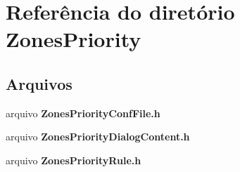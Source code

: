 \section{Referência do diretório Zones\+Priority}
\label{dir_1fe8d817410ee6ec2505eedad072a203}
\subsection*{Arquivos}
\begin{DoxyCompactItemize}
\item 
arquivo {\bf Zones\+Priority\+Conf\+File.\+h}
\item 
arquivo {\bf Zones\+Priority\+Dialog\+Content.\+h}
\item 
arquivo {\bf Zones\+Priority\+Rule.\+h}
\end{DoxyCompactItemize}
